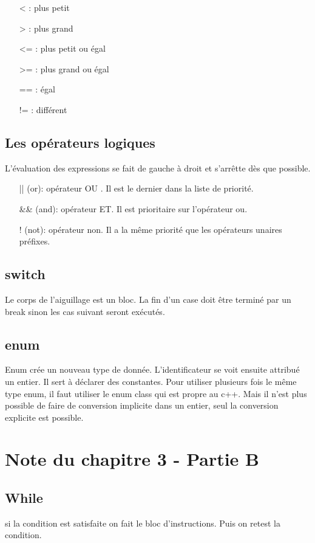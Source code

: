 \documentclass{article}
\begin{document}
\bigskip
\begin{itemize}
    \item [< :] plus petit 
    \item [> :] plus grand
    \item [<= :] plus petit ou égal
    \item [>= :] plus grand ou égal
    \item [== :] égal
    \item [!= :] différent
\end{itemize}
\bigskip

\subsection{Les opérateurs logiques}
L'évaluation des expressions se fait de gauche à droit et s'arrêtte dès que possible. 
\bigskip
\begin{itemize}
    \item [|| (or):] opérateur OU . Il est le dernier dans la liste de priorité. 
    \item [\&\& (and):] opérateur ET. Il est prioritaire sur l'opérateur ou. 
    \item [! (not):] opérateur non. Il a la même priorité que les opérateurs unaires préfixes. 
\end{itemize}
\bigskip

\subsection{switch}
Le corps de l'aiguillage est un bloc. La fin d'un case doit être terminé par un break sinon les cas suivant seront exécutés. 

\subsection{enum}
Enum crée un nouveau type de donnée. L'identificateur se voit ensuite attribué un entier. Il sert à déclarer des constantes. Pour utiliser plusieurs fois le même type enum, il faut utiliser le enum class qui est propre au c++. Mais il n'est plus possible de faire de conversion implicite dans un entier, seul la conversion explicite est possible. 

\section{Note du chapitre 3 - Partie B}
\subsection{While}
si la condition est satisfaite on fait le bloc d'instructions. Puis on retest la condition. 
\end{document}
